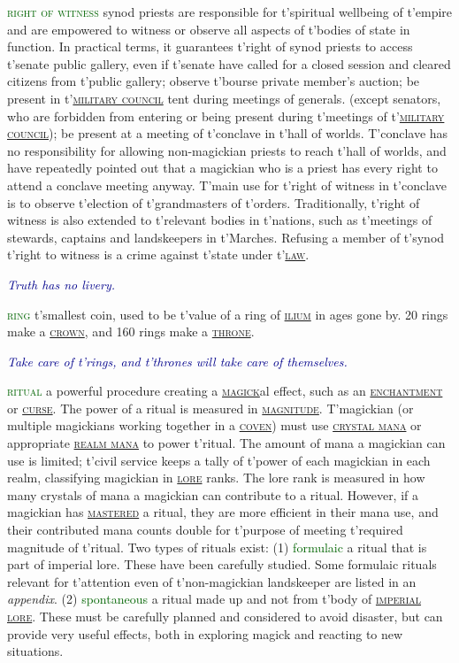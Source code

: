 \documentclass[twoside,11pt,b5paper,twocolumn]{scrbook}
\newcommand{\estcab}[1]{\textsc{\textcolor{marron}{#1}}}
\newcommand{\keyword}[1]{\textcolor{darkgreen}{#1}}
\renewcommand{\paragraph}[1]{\par\noindent\markboth{#1}{#1}\estcab{\keyword{#1}}\label{#1} }
\newcommand{\see}[1]{{\estcab{\hyperref[#1]{#1}}}}
\newcommand{\proverb}[1]{\par \textcolor{darkblue}{\itshape #1}}
\begin{document}
\paragraph{right of witness} synod priests are responsible for t'spiritual wellbeing of t'empire and are empowered to witness or observe all aspects of t'bodies of state in function. In practical terms, it guarantees t'right of synod priests to access t'senate public gallery, even if t'senate have called for a closed session and cleared citizens from t'public gallery; observe t'bourse private member's auction; be present in t'\see{military council} tent during meetings of generals. (except senators, who are forbidden from entering or being present during t'meetings of t'\see{military council}); be present at a meeting of t'conclave in t'hall of worlds. T'conclave has no responsibility for allowing non-magickian priests to reach t'hall of worlds, and have repeatedly pointed out that a magickian who is a priest has every right to attend a conclave meeting anyway. T'main use for t'right of witness in t'conclave is to observe t'election of t'grandmasters of t'orders. Traditionally, t'right of witness is also extended to t'relevant bodies in t'nations, such as t'meetings of stewards, captains and landskeepers in t'Marches. Refusing a member of t'synod t'right to witness is a crime against t'state under t'\see{law}. \proverb{Truth has no livery.}
\paragraph{ring} t'smallest coin, used to be t'value of a ring of \see{ilium} in ages gone by. 20 rings make a \see{crown}, and 160 rings make a \see{throne}. \proverb{Take care of t'rings, and t'thrones will take care of themselves.}
\paragraph{ritual} a powerful procedure creating a \see{magick}al effect, such as an \see{enchantment} or \see{curse}. The power of a ritual is measured in \see{magnitude}. T'magickian (or multiple magickians working together in a \see{coven}) must use \see{crystal mana} or appropriate \see{realm mana} to power t'ritual. The amount of mana a magickian can use is limited; t'civil service keeps a tally of t'power of each magickian in each realm, classifying magickian in \see{lore} ranks. The lore rank is measured in how many crystals of mana a magickian can contribute to a ritual. However, if a magickian has \see{mastered} a ritual, they are more efficient in their mana use, and their contributed mana counts double for t'purpose of meeting t'required magnitude of t'ritual. Two types of rituals exist: (1) \keyword{formulaic} a ritual that is part of imperial lore. These have been carefully studied. Some formulaic rituals relevant for t'attention even of t'non-magickian landskeeper are listed in an \emph{appendix}. (2) \keyword{spontaneous} a ritual made up and not from t'body of \see{imperial lore}. These must be carefully planned and considered to avoid disaster, but can provide very useful effects, both in exploring magick and reacting to new situations.
\end{document}
